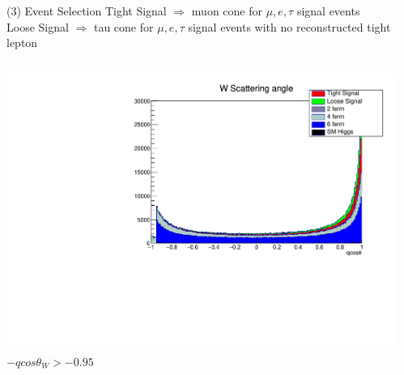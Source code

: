 \documentclass[10pt]{beamer}
\begin{document}
\begin{frame}{(3) Event Selection}
\scriptsize
Tight Signal $\Rightarrow$  muon cone for $\mu,e,\tau$ signal events\\
Loose Signal $\Rightarrow$  tau cone for $\mu,e,\tau$ signal events with no reconstructed tight lepton\\
\begin{columns}
\begin{column}{0.5\textwidth}
\includegraphics[scale=0.3, left]{qcostHist.pdf} \\
$-qcos\theta_W > -0.95$
\end{column}
\begin{column}{0.5\textwidth}

\end{column}
\end{columns}
\end{frame}
\end{document}
